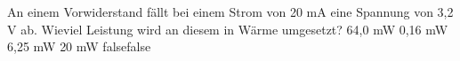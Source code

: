     {An einem Vorwiderstand fällt bei einem Strom von 20 mA eine Spannung von 3,2 V ab. Wieviel Leistung wird an diesem in Wärme umgesetzt?}
    {64,0 mW}
    {0,16 mW}
    {6,25 mW}
    {20 mW}
    {false}{false}